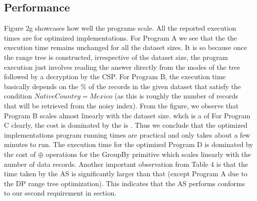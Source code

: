  \subsection*{Performance}
 Figure 2g showcases how well the \system programs scale. All the reported execution times are for optimized implementations. For Program A we see that the the execution time remains unchanged for all the dataset sizes. It is so because once the range tree is constructed, irrespective of the dataset size, the program execution just involves reading the answer directly from the modes of the tree followed by a decryption by the \textsf{CSP}. For Program B, the execution time basically depends on the \% of the records in the given dataset that satisfy the condition $NativeCountry=Mexico$ (as this is roughly the number of records that will be retrieved from the noisy index). From the figure, we observe that Program B scales almost linearly with the dataset size. whch is a of 
 For Program C clearly, the cost is dominated by the  is . Thus we conclude that the optimized implementations \system program running times are practical and only takes about a few minutes to run. The execution time for the optimized Program D is dominated by the cost of $\oplus$ operations for the \textsf{GroupBy} primitive which scales linearly with the number of data records. Another important observation from Table 4 is that the time taken by the \textsf{AS} is significantly larger than that  (except Program A due to the DP range tree optimization). This indicates that the \textsf{AS} performs conforms to our second requirement in section. %
